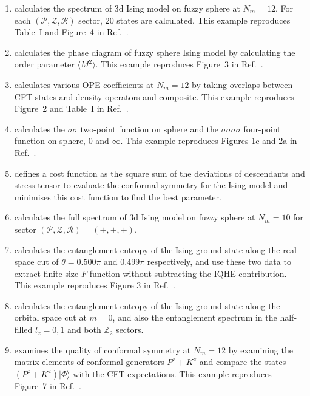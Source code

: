 \documentclass{timesjhep}
\begin{document}
\begin{enumerate}
    \item {} calculates the spectrum of 3d Ising model on fuzzy sphere at $N_m = 12$. For each $(\mathcal{P},\mathcal{Z},\mathcal{R})$ sector, 20 states are calculated. This example reproduces Table~I and Figure~4 in Ref.~\cite{Zhu2022}.
    \item {} calculates the phase diagram of fuzzy sphere Ising model by calculating the order parameter $\langle M^2\rangle$. This example reproduces Figure~3 in Ref.~\cite{Zhu2022}.
    \item {} calculates various OPE coefficients at $N_m = 12$ by taking overlaps between CFT states and density operators and composite. This example reproduces Figure~2 and Table~I in Ref.~\cite{Hu2023Mar}.
    \item {} calculates the $\sigma\sigma$ two-point function on sphere and the $\sigma\sigma\sigma\sigma$ four-point function on sphere, 0 and $\infty$. This example reproduces Figures 1c and 2a in Ref.~\cite{Han2023Jun}.
    \item {} defines a cost function as the square sum of the deviations of descendants and stress tensor to evaluate the conformal symmetry for the Ising model and minimises this cost function to find the best parameter.
    \item {} calculates the full spectrum of 3d Ising model on fuzzy sphere at $N_m = 10$ for sector $(\mathcal{P},\mathcal{Z},\mathcal{R}) = (+,+,+)$.
    \item {} calculates the entanglement entropy of the Ising ground state along the real space cut of $\theta = 0.500\pi$ and $0.499\pi$ respectively, and use these two data to extract finite size $F$-function without subtracting the IQHE contribution. This example reproduces Figure 3 in Ref.~\cite{Hu2024}.
    \item {} calculates the entanglement entropy of the Ising ground state along the orbital space cut at $m = 0$, and also the entanglement spectrum in the half-filled $l_z = 0,1$ and both $\mathbb{Z}_2$ sectors.
    \item {} examines the quality of conformal symmetry at $N_m = 12$ by examining the matrix elements of conformal generators $P^z + K^z$ and compare the states $(P^z + K^z)|\Phi\rangle$ with the CFT expectations. This example reproduces Figure~7 in Ref.~\cite{Fardelli2024}.

\end{enumerate}
\end{document}
